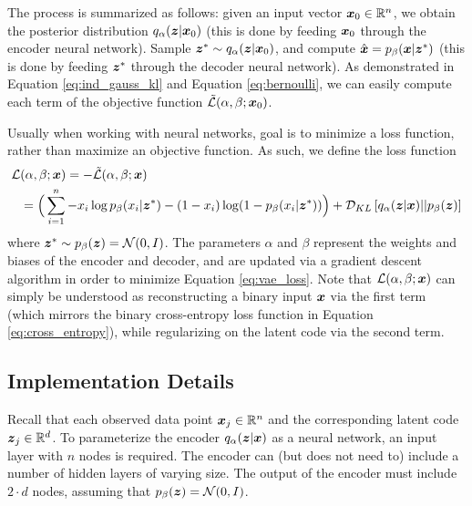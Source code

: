The process is summarized as follows: given an input vector $\boldsymbol{x}_0 \in \mathbb{R}^n$, we obtain the posterior distribution $q_\alpha(\boldsymbol{z} | \boldsymbol{x}_0)$ (this is done by feeding $\boldsymbol{x}_0$ through the encoder neural network). Sample $\boldsymbol{z}^* \sim q_\alpha(\boldsymbol{z} |\boldsymbol{x}_0)$, and compute $\hat{\boldsymbol{x}} = p_\beta(\boldsymbol{x} | \boldsymbol{z}^*)$ (this is done by feeding $\boldsymbol{z}^*$ through the decoder neural network). As demonstrated in Equation \ref{eq:ind_gauss_kl} and Equation \ref{eq:bernoulli}, we can easily compute each term of the objective function $\tilde{\mathcal{L}}(\alpha, \beta; \boldsymbol{x}_0)$.

Usually when working with neural networks, goal is to minimize a loss function, rather than maximize an objective function. As such, we define the loss function 
\begin{equation}
  \label{eq:vae_loss}
  \begin{split}
  \mathcal{L}&(\alpha, \beta; \boldsymbol{x}) = - \tilde{\mathcal{L}}(\alpha, \beta;\boldsymbol{x}) \\
  &= \Big(\sum_{i=1}^n - x_i\log p_\beta(x_i | \boldsymbol{z}^*) - (1-x_i)\log (1-p_\beta(x_i | \boldsymbol{z}^*)) \Big) + \mathcal{D}_{KL}\left[ q_\alpha(\boldsymbol{z} | \boldsymbol{x}) || p_\beta(\boldsymbol{z}) \right]
  \end{split}
\end{equation}
where $\boldsymbol{z}^* \sim p_\beta(\boldsymbol{z}) = \mathcal{N}(0,I)$. The parameters $\alpha$ and $\beta$ represent the weights and biases of the encoder and decoder, and are updated via a gradient descent algorithm in order to minimize Equation \ref{eq:vae_loss}. Note that $\mathcal{L}(\alpha, \beta; \boldsymbol{x})$ can simply be understood as reconstructing a binary input $\boldsymbol{x}$ via the first term (which mirrors the binary cross-entropy loss function in Equation \ref{eq:cross_entropy}), while regularizing on the latent code via the second term.


\subsection{Implementation Details}
Recall that each observed data point $\boldsymbol{x}_j \in \mathbb{R}^n$ and the corresponding latent code $\boldsymbol{z}_j \in \mathbb{R}^d$. To parameterize the encoder $q_\alpha(\boldsymbol{z} | \boldsymbol{x})$ as a neural network, an input layer with $n$ nodes is required. The encoder can (but does not need to) include a number of hidden layers of varying size. The output of the encoder must include $2\cdot d$ nodes, assuming that $p_\beta(\boldsymbol{z}) = \mathcal{N}(0,I)$. 

